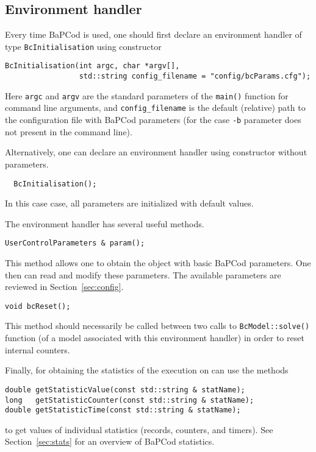 \documentclass[10pt,a4paper]{article}
\newcommand{\bc}{BaPCod\xspace}
\begin{document}
\subsection{Environment handler}
\label{sec:environment}

Every time \bc is used, one should first declare an environment handler of type \verb+BcInitialisation+ using constructor
\begin{lstlisting}
BcInitialisation(int argc, char *argv[], 
                 std::string config_filename = "config/bcParams.cfg");
\end{lstlisting}
Here \verb+argc+ and \verb+argv+ are the standard parameters of the \verb+main()+ function for command line arguments, and
\verb+config_filename+ is the default (relative) path to the configuration file with \bc parameters (for the case
\verb+-b+ parameter does not present in the command line).

Alternatively, one can declare an environment handler using constructor without parameters. 
\begin{lstlisting}
  BcInitialisation();
\end{lstlisting}
In this case case, all parameters are initialized with default values. 

The environment handler has several useful methods.
\begin{lstlisting}
UserControlParameters & param();
\end{lstlisting}
This method allows one to obtain the object with basic \bc parameters. One then can read and modify these
parameters. The available parameters are reviewed in Section~\ref{sec:config}.

\begin{lstlisting}
void bcReset();
\end{lstlisting}
This method should necessarily be called between two calls to \verb+BcModel::solve()+ function (of a model associated with this
environment handler) in order to reset internal counters.

Finally, for obtaining the statistics of the execution on can use the methods
\begin{lstlisting}
double getStatisticValue(const std::string & statName); 
long   getStatisticCounter(const std::string & statName); 
double getStatisticTime(const std::string & statName); 
\end{lstlisting}
to get values of individual statistics (records, counters, and timers). See
Section~\ref{sec:stats} for an overview of \bc statistics.
\end{document}

